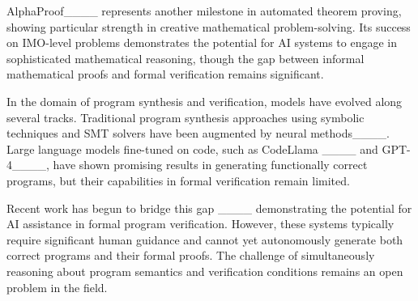AlphaProof____ represents another milestone in automated theorem proving, showing particular strength in creative mathematical problem-solving. Its success on IMO-level problems demonstrates the potential for AI systems to engage in sophisticated mathematical reasoning, though the gap between informal mathematical proofs and formal verification remains significant.

In the domain of program synthesis and verification, models have evolved along several tracks. Traditional program synthesis approaches using symbolic techniques and SMT solvers have been augmented by neural methods____. Large language models fine-tuned on code, such as CodeLlama ____ and GPT-4____, have shown promising results in generating functionally correct programs, but their capabilities in formal verification remain limited.

Recent work has begun to bridge this gap ____ demonstrating the potential for AI assistance in formal program verification. However, these systems typically require significant human guidance and cannot yet autonomously generate both correct programs and their formal proofs. The challenge of simultaneously reasoning about program semantics and verification conditions remains an open problem in the field.